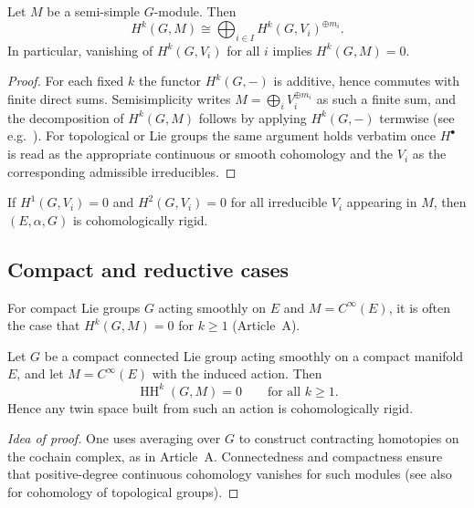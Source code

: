 \documentclass[11pt,a4paper]{article}
\numberwithin{equation}{section}
\DeclareMathOperator{\HH}{HH}
\newcommand{\TwinSpace}{(E,\alpha,G)}
\begin{document}
	\begin{proposition}
		Let $M$ be a semi-simple $G$-module. Then
		\[
		H^k(G,M) \cong \bigoplus_{i\in I} H^k(G,V_i)^{\oplus m_i}.
		\]
		In particular, vanishing of $H^k(G,V_i)$ for all $i$ implies $H^k(G,M)=0$.
	\end{proposition}
	
	\begin{proof}
		For each fixed $k$ the functor $H^k(G,-)$ is additive, hence commutes with finite direct sums. Semisimplicity
		writes $M=\bigoplus_i V_i^{\oplus m_i}$ as such a finite sum, and the decomposition of $H^k(G,M)$ follows by
		applying $H^k(G,-)$ termwise (see e.g.\ \cite{Weibel1994}). For topological or Lie groups the same argument
		holds verbatim once $H^\bullet$ is read as the appropriate continuous or smooth cohomology and the $V_i$ as
		the corresponding admissible irreducibles.
	\end{proof}
	
	\begin{corollary}
		If $H^1(G,V_i)=0$ and $H^2(G,V_i)=0$ for all irreducible $V_i$ appearing in $M$,
		then $\TwinSpace$ is cohomologically rigid.
	\end{corollary}
	
	\subsection{Compact and reductive cases}
	
	For compact Lie groups $G$ acting smoothly on $E$ and $M=C^\infty(E)$, it is often the case that
	$H^k(G,M)=0$ for $k\ge 1$ (Article~A).
	
	\begin{theorem}
		\label{thm:compact-rigid-C}
		Let $G$ be a compact connected Lie group acting smoothly on a compact manifold $E$, and let
		$M=C^\infty(E)$ with the induced action. Then
		\[
		\HH^k(G,M)=0 \qquad \text{for all } k\ge 1.
		\]
		Hence any twin space built from such an action is cohomologically rigid.
	\end{theorem}
	
	\begin{proof}[Idea of proof]
		One uses averaging over $G$ to construct contracting homotopies on the cochain complex, as in Article~A.
		Connectedness and compactness ensure that positive-degree continuous cohomology vanishes
		for such modules (see also \cite{Weibel1994} for cohomology of topological groups).
	\end{proof}
	
\end{document}

